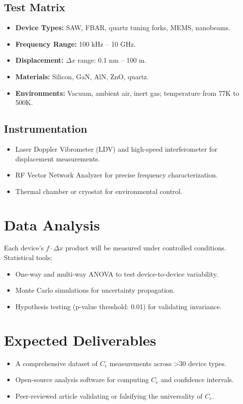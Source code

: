         \subsection*{Test Matrix}
        \begin{itemize}
            \item \textbf{Device Types:} SAW, FBAR, quartz tuning forks, MEMS, nanobeams.
            \item \textbf{Frequency Range:} 100 kHz -- 10 GHz.
            \item \textbf{Displacement:} \( \Delta x \) range: 0.1 nm -- 100 \textmu m.
            \item \textbf{Materials:} Silicon, GaN, AlN, ZnO, quartz.
            \item \textbf{Environments:} Vacuum, ambient air, inert gas; temperature from 77K to 500K.
        \end{itemize}

        \subsection*{Instrumentation}
        \begin{itemize}
            \item Laser Doppler Vibrometer (LDV) and high-speed interferometer for displacement measurements.
            \item RF Vector Network Analyzer for precise frequency characterization.
            \item Thermal chamber or cryostat for environmental control.
        \end{itemize}

        \section*{Data Analysis}
        Each device's \( f \cdot \Delta x \) product will be measured under controlled conditions. Statistical tools:
        \begin{itemize}
            \item One-way and multi-way ANOVA to test device-to-device variability.
            \item Monte Carlo simulations for uncertainty propagation.
            \item Hypothesis testing (p-value threshold: 0.01) for validating invariance.
        \end{itemize}

        \section*{Expected Deliverables}
        \begin{itemize}
            \item A comprehensive dataset of \( C_e \) measurements across >30 device types.
            \item Open-source analysis software for computing \( C_e \) and confidence intervals.
            \item Peer-reviewed article validating or falsifying the universality of \( C_e \).
        \end{itemize}

